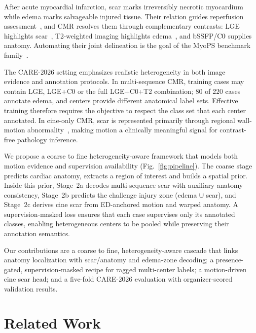 \documentclass[runningheads]{llncs}
\begin{document}
After acute myocardial infarction, scar marks irreversibly necrotic myocardium
while edema marks salvageable injured tissue. Their relation
guides reperfusion assessment~\cite{eitel2011cardiac,ibanez2015evolving}, and
CMR resolves them through complementary contrasts: LGE highlights
scar~\cite{kim1999relationship}, T2-weighted imaging highlights
edema~\cite{abdelaty2004delayed}, and bSSFP/C0 supplies anatomy. Automating
their joint delineation is the goal of the MyoPS benchmark
family~\cite{li2023myops,zhuang2019multivariate}.

The CARE-2026 setting emphasizes realistic heterogeneity in both image evidence
and annotation protocols. In multi-sequence CMR, training cases may contain LGE,
LGE+C0 or the full LGE+C0+T2 combination; 80 of 220 cases annotate edema, and
centers provide different anatomical label sets. Effective training therefore
requires the objective to respect the class set that each center annotated. In
cine-only CMR, scar is represented primarily through regional wall-motion
abnormality~\cite{zhang2019deeplearningcine,ding2025cinemyops}, making motion a
clinically meaningful signal for contrast-free pathology inference.

We propose a coarse to fine heterogeneity-aware framework that models both
motion evidence and supervision availability (Fig.~\ref{fig:pipeline}).
The coarse stage predicts cardiac anatomy, extracts a region of interest and
builds a spatial prior. Inside this prior, Stage~2a decodes multi-sequence scar
with auxiliary anatomy consistency, Stage~2b predicts the challenge injury zone
(edema $\cup$ scar), and Stage~2c derives cine scar from ED-anchored motion and
warped anatomy. A supervision-masked loss ensures that each case supervises
only its annotated classes, enabling heterogeneous centers to be pooled while
preserving their annotation semantics.

Our contributions are a coarse to fine, heterogeneity-aware cascade that links
anatomy localization with scar/anatomy and edema-zone decoding; a
presence-gated, supervision-masked recipe for ragged multi-center labels; a
motion-driven cine scar head; and a five-fold CARE-2026 evaluation with
organizer-scored validation results.

\section{Related Work}
\end{document}
